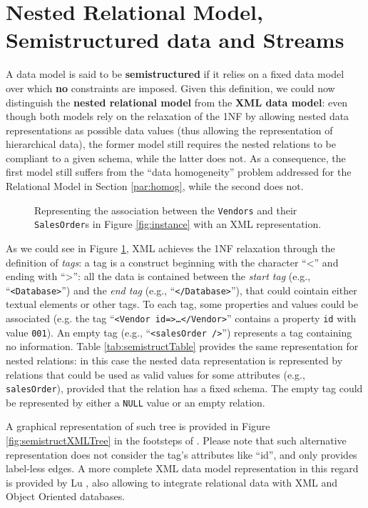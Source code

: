 
\section{Nested Relational Model, Semistructured data and Streams}\label{sec:semistructured}
A data model is said to be \textbf{semistructured} if it relies on a fixed data model over which \textbf{no} constraints are imposed. Given this definition, we could now distinguish the \textbf{nested relational model} from the \textbf{XML data model}: even though both models rely on the relaxation of the 1NF by allowing nested data representations as possible data values (thus allowing the representation of hierarchical data), the former model still requires the nested relations to be compliant to a given schema, while the latter does not. As a consequence, the first model still suffers from the ``data homogeneity'' problem addressed for the Relational Model in Section \vref{par:homog}, while the second does not. 

\begin{figure}[!hpt]

\caption{Representing the association between the \texttt{Vendors} and their \texttt{SalesOrder}s in Figure \ref{fig:instance} with an XML representation.}
\label{fig:semistructXML}
\end{figure}


\begin{example}
	As we could see in Figure \ref{fig:semistructXML}, XML achieves the 1NF relaxation through the definition of \textit{tags}: a tag is a construct beginning with the character ``<'' and ending with ``>'': all the data is contained between the \textit{start tag} (e.g., ``\texttt{<Database>}'') and the \textit{end tag} (e.g., ``\texttt{</Database>}''), that could cointain either textual elements or other tags. To each tag, some properties and values could be associated (e.g. the tag ``\texttt{<Vendor id=\textquotedbl>\dots </Vendor>}'' contains a property \texttt{id} with value \texttt{001}). An empty tag (e.g., ``\texttt{<salesOrder />}'') represents a tag containing no information. Table \ref{tab:semistructTable} provides the same representation for nested relations: in this case the nested data representation is represented by relations that could be used as valid values for some attributes (e.g., \texttt{salesOrder}), provided that the relation has a fixed schema. The empty tag could be represented by either a \texttt{NULL} value or an empty relation. 
	
	A graphical representation of such tree is provided in Figure \ref{fig:semistructXMLTree} in the footsteps of \cite{Magnani06}. Please note that such alternative representation does not consider the tag's attributes like ``id'', and only provides label-less edges. A more complete XML data model representation in this regard is provided by Lu \cite{Lu2006}, also allowing to integrate relational data with XML and Object Oriented databases.
\end{example}


